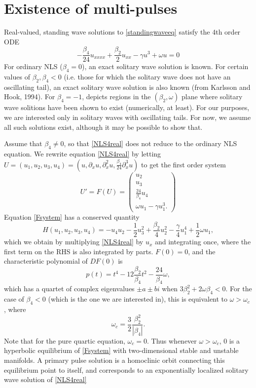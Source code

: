 \documentclass[12pt]{article}
\begin{document}
\section{Existence of multi-pulses}

Real-valued, standing wave solutions to \cref{standingwaveeq} satisfy the 4th order ODE
\begin{equation}\label{NLS4real}
-\frac{\beta_4}{24} u_{xxxx} + \frac{\beta_2}{2} u_{xx} - \gamma u^3 + \omega u = 0
\end{equation}
For ordinary NLS ($\beta_4 = 0$), an exact solitary wave solution is known. For certain values of $\beta_2, \beta_4 < 0$ (i.e. those for which the solitary wave does not have an oscillating tail), an exact solitary wave solution is also known \cite[(5)]{Tam2020} (from Karlsson and Hook, 1994). For $\beta_4 = -1$, \cite[Figure 4(a)]{Tam2020} depicts regions in the $(\beta_2, \omega)$ plane where solitary wave solitions have been shown to exist (numerically, at least). For our purposes, we are interested only in solitary waves with oscillating tails. For now, we assume all such solutions exist, although it may be possible to show that.

Assume that $\beta_4 \neq 0$, so that \cref{NLS4real} does not reduce to the ordinary NLS equation. We rewrite equation \cref{NLS4real} by letting $U = (u_1, u_2, u_3, u_4) = (u, \partial_x u, \partial_x^2 u, \frac{\beta_4}{24} \partial_x^3 u)$ to get the first order system
\begin{equation}\label{Fsystem}
U' = F(U) = \begin{pmatrix}
u_2 \\ u_3 \\ \frac{24}{\beta_4} u_4 \\ \omega u_1 - \gamma u_1^3.
\end{pmatrix}
\end{equation}
Equation \cref{Fsystem} has a conserved quantity
\begin{equation}\label{FsystemH}
H(u_1, u_2, u_3, u_4) = -u_4 u_2 - \frac{1}{2} u_3^2 + \frac{\beta_2}{4}u_2^2 - \frac{\gamma}{4} u_1^4 + \frac{1}{2}\omega u_1,
\end{equation}
which we obtain by multiplying \cref{NLS4real} by $u_x$ and integrating once, where the first term on the RHS is also integrated by parts. $F(0) = 0$, and the characteristic polynomial of $DF(0)$ is
\[
p(t) = t^4 - 12\frac{\beta_2}{\beta_4} t^2 - \frac{24}{\beta_4}\omega,
\]
which has a quartet of complex eigenvalues $\pm a \pm b i$ when $3 \beta_2^2 + 2 \omega \beta_4 < 0$. For the case of $\beta_4 < 0$ (which is the one we are interested in), this is equivalent to $\omega > \omega_c$ \cite[(11)]{Tam2020}, where
\begin{equation}\label{omegac}
\omega_c = \frac{3}{2} \frac{\beta_2^2}{|\beta_4|}.
\end{equation}
Note that for the pure quartic equation, $\omega_c = 0$. Thus whenever $\omega > \omega_c$, 0 is a hyperbolic equilibrium of \cref{Fsystem} with two-dimensional stable and unstable manifolds. A primary pulse solution is a homoclinic orbit connecting this equilibrium point to itself, and corresponds to an exponentially localized solitary wave solution of \cref{NLS4real}
\end{document}
